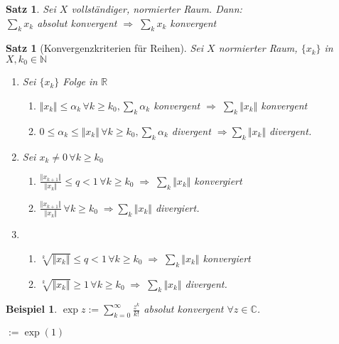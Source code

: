 \documentclass[ngerman,a4paper]{report}
\theoremstyle{break}
\newtheorem{example}[theorem]{Beispiel}
\newtheorem{satz}[theorem]{Satz}
\newcommand{\person}[1]{\textsc{#1}}
\begin{document}
\begin{satz}
	Sei $X$ vollständiger, normierter Raum. Dann:\\
	$\sum_k x_k$ absolut konvergent $\Rightarrow\;\sum_k x_k$ konvergent
\end{satz}
\begin{satz}[Konvergenzkriterien für Reihen]
	Sei $X$ normierter Raum, $\{x_k\}$ in $X, k_0\in\mathbb{N}$
	\begin{enumerate}[label={\alph*)}]
		\item Sei $\{x_k\}$ Folge in $\mathbb{R}$ \hfill{}
		\begin{enumerate}[label={\alph*)}]
			\item $\Vert x_k\Vert \le \alpha_k\,\forall k\ge k_0,\sum_k \alpha_k$ konvergent $\Rightarrow\;\sum_k \Vert x_k\Vert$ konvergent
			\item $0 \le \alpha_k \le \Vert x_k\Vert\,\forall k\ge k_0,\sum_k \alpha_k$ divergent $\Rightarrow\sum_k\Vert x_k\Vert$ divergent.
		\end{enumerate}
		\item Sei $x_k\neq 0\,\forall k\ge k_0$\hfill{}
		\begin{enumerate}[label={\alph*)}]
			\item $\frac{\Vert x_{k+1}\Vert}{\Vert x_k\Vert} \le q < 1\,\forall k\ge k_0 \;\Rightarrow\;\sum_k \Vert x_k\Vert$ konvergiert
			\item $\frac{\Vert x_{k+1}\Vert}{\Vert x_k\Vert}\,\forall k\ge k_0\;\Rightarrow \sum_k\Vert x_k\Vert$ divergiert.
		\end{enumerate}
		\item \hfill{}
		\begin{enumerate}[label={\alph*)}]
			\item $\sqrt[k]{\Vert x_k\Vert}\le q < 1\,\forall k\ge k_0\;\Rightarrow\;\sum_k\Vert x_k\Vert$ konvergiert
			\item $\sqrt[k]{\Vert x_k\Vert} \ge 1\,\forall k\ge k_0\;\Rightarrow\;\sum_k \Vert x_k\Vert$ divergent.
		\end{enumerate}
	\end{enumerate}
\end{satz}
\begin{example}
	 $\exp z := \sum_{k=0}^\infty \frac{z^k}{k!}$ absolut konvergent $\forall z\in \mathbb{C}$.
	
	$:=\exp(1)$ \begriff{\person{Euler}'sche Zahl}
\end{example}
\end{document}
